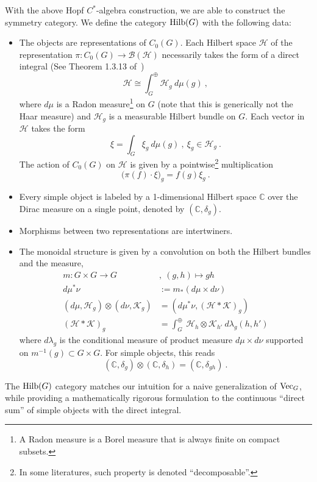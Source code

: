\documentclass[a4paper,11pt]{article}
\newcommand{\Ch}{\mathrm{Ch}}
\newcommand{\CH}{\Ch_{\mu_1\mu_2}(Q_F,{t},{q})}
\newcommand{\be}{\begin{equation}}
\newcommand{\ee}{\end{equation}}
\newcommand{\ba}{\begin{aligned}}
\newcommand{\ea}{\end{aligned}}
\def\bbC{\mathbb{C}}
\def\CH{\mathcal{H}}
\def\CK{\mathcal{K}}
\def\vecg{{\rm Vec}_G}
\begin{document}
With the above Hopf $C^*$-algebra construction, we are able to construct the symmetry category. We define the category ${\rm Hilb}(G)$ with the following data:
\begin{itemize}
    \item The objects are representations of $C_0(G)$. Each Hilbert space $\CH$ of the  representation $\pi : C_0(G) \to \mathscr{B}(\CH)$ necessarily takes the form of a direct integral (See Theorem 1.3.13 of~\cite{Renault:2009})
    \be
    \CH \cong \int_G^\oplus  \CH_g \  d\mu(g) \ ,
    \ee
    where $d\mu$ is a Radon measure\footnote{A Radon measure is a Borel measure that is always finite on compact subsets.} on $G$ (note that this is generically not the Haar measure) and $\CH_g$ is a measurable Hilbert bundle on $G$. Each vector in $\CH$ takes the form
    \be \xi = \int_G  \xi_g \ d\mu(g) \  , \ \xi_g \in \CH_g \ .\ee
    The action of $C_0(G)$ on $\CH$ is given by a pointwise\footnote{In some literatures, such property is denoted ``decomposable''.} multiplication
    \be \big(\pi(f)\cdot \xi\big)_g = f(g)\xi_g \ .  \ee
    \item Every simple object is labeled by a 1-dimensional Hilbert space $\bbC$ over the Dirac measure on a single point, denoted by $(\bbC, \delta_g)$.
    \item Morphisms between two representations are intertwiners.
    \item The monoidal structure is given by a convolution on both the Hilbert bundles and the measure,
        \be \ba
        m: G\times G\to G \ &, \ (g,h)\mapsto gh \\
        d\mu^*\nu &:= m_*(d\mu\times d\nu)\\
        (d\mu, \CH_g) \otimes (d\nu,\CK_g) &= (d\mu^*\nu, (\CH*\CK)_g ) \\
        (\CH*\CK)_g &= \int_G^{\oplus} \ \CH_{h}\otimes \CK_{h'} \ d\lambda_g(h,h')
        \ea \ee
        where $d\lambda_g$ is the conditional measure of product measure $d\mu\times d\nu$ supported on $m^{-1}(g)\subset G\times G$. For simple objects, this reads
        \be (\bbC,\delta_g) \otimes (\bbC,\delta_h) = (\bbC,\delta_{gh}) \ .  \ee
\end{itemize}
The ${\rm Hilb}(G)$ category matches our intuition for a naive generalization of $\vecg$, while providing a mathematically rigorous formulation to the continuous ``direct sum'' of simple objects with the direct integral.
\end{document}
